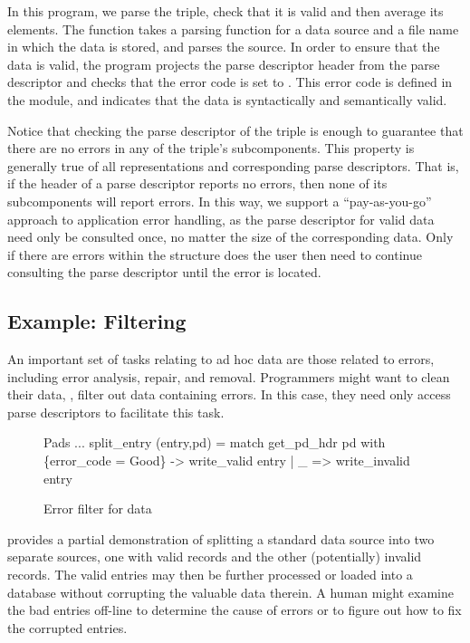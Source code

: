 In this program, we parse the triple, check that it is valid and then
average its elements. The function  takes a parsing
function for a data source and a file name in which the data is
stored, and parses the source. In order to ensure that the data is
valid, the program projects the parse descriptor header from the parse
descriptor  and checks that the error code is set to .
This error code is defined in the  module, and indicates that
the data is syntactically and semantically valid.

Notice that checking the parse descriptor of the triple is enough to
guarantee that there are no errors in any of the triple's
subcomponents. This property is generally true of all representations
and corresponding parse descriptors. That is, if the header of a parse
descriptor reports no errors, then none of its subcomponents will
report errors. In this way, we support a ``pay-as-you-go'' approach to
application error handling, as the parse descriptor for valid data
need only be consulted once, no matter the size of the corresponding
data. Only if there are errors within the structure does the user then
need to continue consulting the parse descriptor until the error is
located.

\subsection{Example: Filtering}
\label{sec:ex-filter}

An important set of tasks relating to ad hoc data are those
related to errors, including error analysis, repair, and removal.
Programmers might want to clean their data, \ie{}, filter out data
containing errors. In this case, they need only access parse
descriptors to facilitate this task.

\begin{figure}
\begin{code}\scriptsize
{} Pads
   ...
 split_entry (entry,pd) =
   match get\_pd\_hdr pd with
     \{error_code = Good\} -> write_valid entry
   | _ => write_invalid entry\end{code}
\caption{Error filter for \dibbler{} data}
\label{fig:ex-data-clean}
\end{figure}

 provides a partial demonstration of
splitting a standard data source into two separate sources, one with
valid records and the other (potentially) invalid records.  The valid
entries may then be further processed or loaded into a database
without corrupting the valuable data therein.  A human might examine
the bad entries off-line to determine the cause of errors or to figure
out how to fix the corrupted entries.

